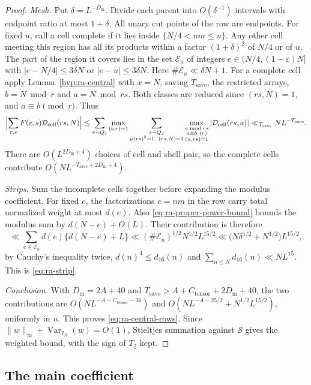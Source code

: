 \begin{proof}
\emph{Mesh.} Put \(\delta=L^{-D_{\mathrm m}}\). Divide each parent into
\(O(\delta^{-1})\) intervals with endpoint ratio at most \(1+\delta\).
All unary cut points of the row are endpoints. For fixed \(u\), call
a cell complete if it lies inside \(\{N/4<nm\le u\}\). Any other cell
meeting this region has all its products within a factor \((1+\delta)^2\)
of \(N/4\) or of \(u\). The part of the region it covers lies in the set
\(\mathcal E_u\) of integers \(e\in(N/4,(1-\varepsilon)N]\) with \(|e-N/4|\le3\delta N\) or
\(|e-u|\le3\delta N\).
Here \(\#\mathcal E_u\ll\delta N+1\). For a complete
cell apply Lemma~\ref{hyp:ra-central} with \(x=N\), saving \(T_{\mathrm{save}}\), the
restricted arrays, \(b=N\bmod r\) and \(a=N\bmod rs\). Both classes are
reduced since \((rs,N)=1\), and \(a\equiv b\pmod r\). Thus
\[
 \Bigl|\sum_{r,s}F(r,s)\mathcal D_{\mathrm{cell}}(rs,N)\Bigr|
 \le\sum_{r\sim Q_1}\max_{(b,r)=1}
   \sum_{\substack{s\sim Q_2\\\mu(rs)^2=1,\ (rs,N)=1}}
   \max_{\substack{a\bmod rs\\a\equiv b\ (r)\\(a,rs)=1}}
   |\mathcal D_{\mathrm{cell}}(rs,a)|
 \ll_{T_{\mathrm{save}}} NL^{-T_{\mathrm{save}}}.
\]
There are \(O(L^{2D_{\mathrm m}+4})\) choices of cell and shell pair, so the
 complete cells contribute \(O(NL^{-T_{\mathrm{save}}+2D_{\mathrm m}+4})\).

\emph{Strips.} Sum the incomplete cells together before expanding
the modulus coefficient. For fixed \(e\), the factorizations
\(e=nm\) in the row carry total normalized weight at most \(d(e)\).
Also \eqref{eq:ra-proper-power-bound} bounds the modulus sum by
\(d(N-e)+O(L)\). Their contribution is therefore
\[
 \ll\sum_{e\in\mathcal E_u}d(e)\{d(N-e)+L\}
 \ll(\#\mathcal E_u)^{1/2}N^{1/2}L^{15/2}
 \ll\bigl(N\delta^{1/2}+N^{1/2}\bigr)L^{15/2},
\]
by Cauchy's inequality twice, \(d(n)^4\le d_{16}(n)\) and
\(\sum_{n\le N}d_{16}(n)\ll NL^{15}\). This is \eqref{eq:ra-strip}.

\emph{Conclusion.} With \(D_{\mathrm m}=2A+40\) and
\(T_{\mathrm{save}}>A+C_{\mathrm{tensor}}+2D_{\mathrm m}+40\), the two contributions are
\(O(NL^{-A-C_{\mathrm{tensor}}-36})\) and \(O(NL^{-A-25/2}+N^{1/2}L^{15/2})\), uniformly
in \(u\). This proves \eqref{eq:ra-central-rows}. Since
\(\|w\|_\infty+\operatorname{Var}_{I_H}(w)=O(1)\), Stieltjes summation
against \(\mathcal S\) gives the weighted bound, with the sign of \(T_2\)
kept.
\end{proof}


\subsection{The main coefficient}

